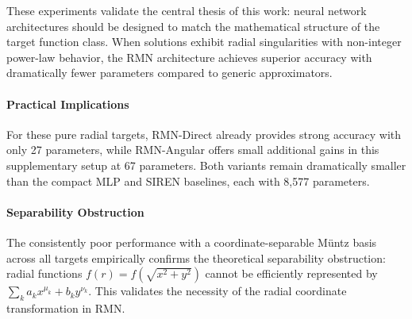 \documentclass[twoside,11pt]{article}
\begin{document}
These experiments validate the central thesis of this work: neural network architectures should be designed to match the mathematical structure of the target function class. When solutions exhibit radial singularities with non-integer power-law behavior, the RMN architecture achieves superior accuracy with dramatically fewer parameters compared to generic approximators.

\paragraph{Practical Implications}
For these pure radial targets, RMN-Direct already provides strong accuracy with only 27 parameters, while RMN-Angular offers small additional gains in this supplementary setup at 67 parameters. Both variants remain dramatically smaller than the compact MLP and SIREN baselines, each with 8,577 parameters.

\paragraph{Separability Obstruction}
The consistently poor performance with a coordinate-separable M\"untz basis across all targets empirically confirms the theoretical separability obstruction: radial functions $f(r) = f(\sqrt{x^2+y^2})$ cannot be efficiently represented by $\sum_k a_k x^{\mu_k} + b_k y^{\nu_k}$. This validates the necessity of the radial coordinate transformation in RMN.



\end{document}
